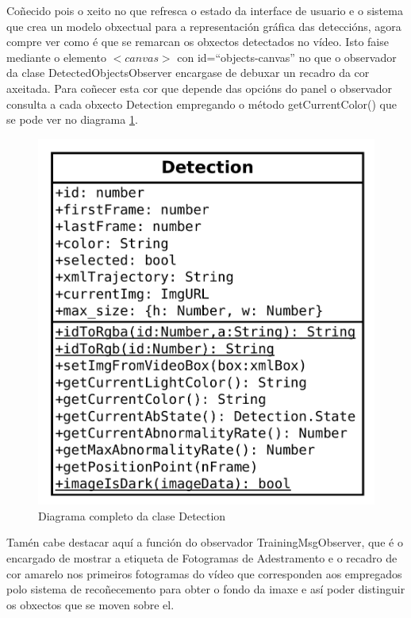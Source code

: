         Coñecido pois o xeito no que refresca o estado da interface de usuario e o sistema que crea un 
        modelo obxectual para a representación gráfica das deteccións, agora compre ver como é que se 
        remarcan os obxectos detectados no vídeo. Isto faise mediante o elemento $<canvas>$ con
        id=``objects-canvas'' no que o observador da clase DetectedObjectsObserver encargase de debuxar
        un recadro da cor axeitada. Para coñecer esta cor que depende das opcións do panel o observador
        consulta a cada obxecto Detection empregando o método getCurrentColor() que se pode ver no 
        diagrama \ref{fig:DetectionClass}.

        
        \begin{figure}[htp]
        \begin{center}
            \includegraphics[scale=0.5]{figures/DetectionClass.pdf}
            \caption{Diagrama completo da clase Detection}
        \label{fig:DetectionClass}
        \end{center}
        \end{figure}
        
        Tamén cabe destacar aquí a función do observador TrainingMsgObserver, que é o encargado de 
        mostrar a etiqueta de Fotogramas de Adestramento e o recadro de cor amarelo nos primeiros 
        fotogramas do vídeo que corresponden aos empregados polo sistema de recoñecemento para obter o 
        fondo da imaxe e así poder distinguir os obxectos que se moven sobre el.
        
